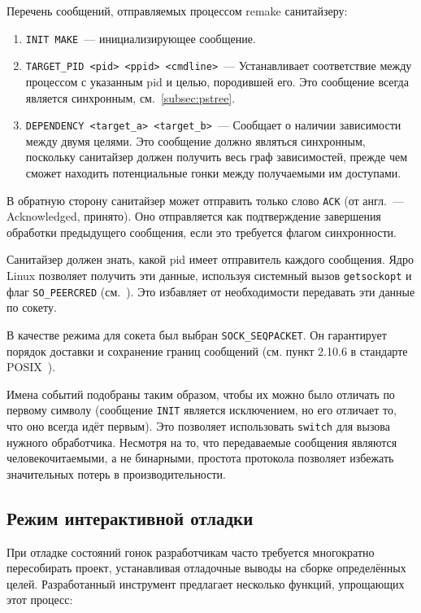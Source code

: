 Перечень сообщений, отправляемых процессом remake санитайзеру:

\begin{enumerate}
    \item \texttt{INIT MAKE}~--- инициализирующее сообщение.
    \item \texttt{TARGET\_PID <pid> <ppid> <cmdline>}~--- Устанавливает соответствие между процессом с указанным pid и целью, породившей его. Это сообщение всегда является синхронным, см.~\ref{subsec:pstree}.
    \item \texttt{DEPENDENCY <target\_a> <target\_b>}~--- Сообщает о наличии зависимости между двумя целями. Это сообщение должно являться синхронным, поскольку санитайзер должен получить весь граф зависимостей, прежде чем сможет находить потенциальные гонки между получаемыми им доступами.
\end{enumerate}

В обратную сторону санитайзер может отправить только слово \texttt{ACK} (от англ.~--- Acknowledged, принято). Оно отправляется как подтверждение завершения обработки предыдущего сообщения, если это требуется флагом синхронности.

Санитайзер должен знать, какой pid имеет отправитель каждого сообщения. Ядро Linux позволяет получить эти данные, используя системный вызов \texttt{getsockopt} и флаг \texttt{SO\_PEERCRED} (см.~\cite{unix-sockets}). Это избавляет от необходимости передавать эти данные по сокету.

В качестве режима для сокета был выбран \texttt{SOCK\_SEQPACKET}. Он гарантирует порядок доставки и сохранение границ сообщений (см. пункт 2.10.6 в стандарте POSIX~\cite{8277153}).

Имена событий подобраны таким образом, чтобы их можно было отличать по первому символу (сообщение \texttt{INIT} является исключением, но его отличает то, что оно всегда идёт первым). Это позволяет использовать \texttt{switch} для вызова нужного обработчика. Несмотря на то, что передаваемые сообщения являются человекочитаемыми, а не бинарными, простота протокола позволяет избежать значительных потерь в производительности.

\subsection{Режим интерактивной отладки}
\label{subsec:interactive-debug}

При отладке состояний гонок разработчикам часто требуется многократно пересобирать проект, устанавливая отладочные выводы на сборке определённых целей. Разработанный инструмент предлагает несколько функций, упрощающих этот процесс:

